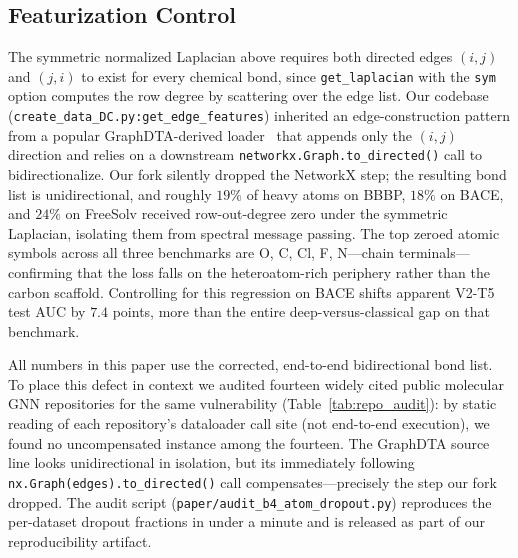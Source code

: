 \documentclass[sigconf,nonacm,anonymous,review]{acmart}
\begin{document}
\subsection{Featurization Control}
\label{sec:featurization-control}
The symmetric normalized Laplacian above requires both directed edges $(i,j)$ and $(j,i)$ to exist for every chemical bond, since \texttt{get\_laplacian} with the \texttt{sym} option computes the row degree by scattering over the edge list. Our codebase (\texttt{create\_data\_DC.py:get\_edge\_features}) inherited an edge-construction pattern from a popular GraphDTA-derived loader~\cite{nguyen2021graphdta} that appends only the $(i,j)$ direction and relies on a downstream \texttt{networkx.Graph.to\_directed()} call to bidirectionalize. Our fork silently dropped the NetworkX step; the resulting bond list is unidirectional, and roughly $19\%$ of heavy atoms on BBBP, $18\%$ on BACE, and $24\%$ on FreeSolv received row-out-degree zero under the symmetric Laplacian, isolating them from spectral message passing. The top zeroed atomic symbols across all three benchmarks are O, C, Cl, F, N---chain terminals---confirming that the loss falls on the heteroatom-rich periphery rather than the carbon scaffold. Controlling for this regression on BACE shifts apparent V2-T5 test AUC by $7.4$ points, more than the entire deep-versus-classical gap on that benchmark.

All numbers in this paper use the corrected, end-to-end bidirectional bond list. To place this defect in context we audited fourteen widely cited public molecular GNN repositories for the same vulnerability (Table~\ref{tab:repo_audit}): by static reading of each repository's dataloader call site (not end-to-end execution), we found no uncompensated instance among the fourteen. The GraphDTA source line looks unidirectional in isolation, but its immediately following \texttt{nx.Graph(edges).to\_directed()} call compensates---precisely the step our fork dropped. The audit script (\texttt{paper/audit\_b4\_atom\_dropout.py}) reproduces the per-dataset dropout fractions in under a minute and is released as part of our reproducibility artifact.
\end{document}
